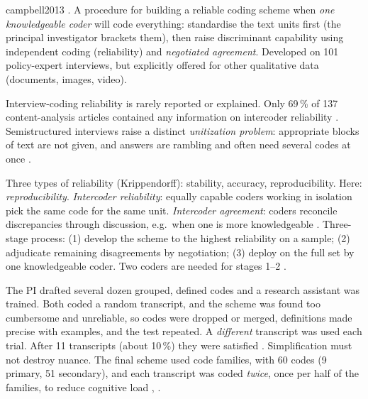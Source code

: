 \begin{papercard}{campbell2013}
  . A procedure for building a reliable coding scheme when \emph{one knowledgeable coder} will code everything: standardise the text units first (the principal investigator brackets them), then raise discriminant capability using independent coding (reliability) and \emph{negotiated agreement}. Developed on 101 policy-expert interviews, but explicitly offered for other qualitative data (documents, images, video).

 Interview-coding reliability is rarely reported or explained. Only 69\,\% of 137 content-analysis articles contained any information on intercoder reliability . Semistructured interviews raise a distinct \emph{unitization problem}: appropriate blocks of text are not given, and answers are rambling and often need several codes at once .

 Three types of reliability (Krippendorff): stability, accuracy, reproducibility. Here: \emph{reproducibility}. \emph{Intercoder reliability}: equally capable coders working in isolation pick the same code for the same unit. \emph{Intercoder agreement}: coders reconcile discrepancies through discussion, e.g.\ when one is more knowledgeable . Three-stage process: (1) develop the scheme to the highest reliability on a sample; (2) adjudicate remaining disagreements by negotiation; (3) deploy on the full set by one knowledgeable coder. Two coders are needed for stages 1--2 .

 The PI drafted several dozen grouped, defined codes and a research assistant was trained. Both coded a random transcript, and the scheme was found too cumbersome and unreliable, so codes were dropped or merged, definitions made precise with examples, and the test repeated. A \emph{different} transcript was used each trial. After 11 transcripts (about 10\,\%) they were satisfied . Simplification must not destroy nuance. The final scheme used code families, with 60 codes (9 primary, 51 secondary), and each transcript was coded \emph{twice}, once per half of the families, to reduce cognitive load , .


\end{papercard}

